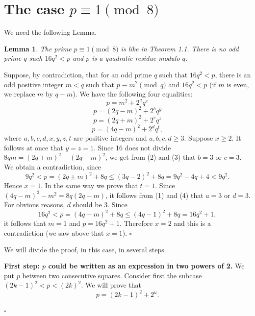 \documentclass[12pt]{article}
\newtheorem{lemma}[definition]{Lemma}
\newenvironment{proof}{{\it Proof.}}{\hfill $ \square $ \vskip 4mm}
\begin{document}
{\section{The case $p\equiv  1\pmod 8$}
We need the following Lemma.
\begin{lemma}
The prime $p\equiv 1 \pmod 8$ is like in Theorem 1.1. There is no odd prime $q$ such $16q^2<p$ and $p$ is a quadratic residue modulo $q$.
\end{lemma}
\begin{proof}
Suppose, by contradiction, that for an odd prime $q$ such that $16q^2<p$, there is an odd positive integer $m<q$ such that $p\equiv m^2\pmod q$ and $16q^2<p$ (if $m$ is even, we replace $m$ by $q-m$). We have  the following four equalities:
\begin{equation}
p=m^2+2^aq^x
\end{equation}
\begin{equation}
p=(2q-m)^2+2^bq^y
\end{equation}
\begin{equation}
p=(2q+m)^2+2^cq^z
\end{equation}
\begin{equation}
p=(4q-m)^2+2^dq^t,
\end{equation}
where $a,b,c,d,x,y,z,t$ are positive integers and $a,b,c,d\geq 3$.
 Suppose $x\geq 2$. It follows at once that $y=z=1$. Since 16  does not divide $8qm=(2q+m)^2-(2q-m)^2$, we get from (2) and (3) that $b=3$ or $c=3$. We obtain a contradiction, since
$$9q^2<p=(2q\pm m)^2+8q\leq (3q-2)^2+8q=9q^2-4q+4<9q^2.$$ Hence $x=1$. In the same way we prove  that $t=1$. Since $(4q-m)^2-m^2=8q(2q-m)$, it follows from (1) and (4) that $a=3$ or $d=3$. For obvious reasons, $d$ should be 3. Since 
$$16q^2<p=(4q-m)^2+8q\leq (4q-1)^2+8q=16q^2+1,$$ it follows that $m=1$ and $p=16q^2+1$. Therefore $x=2$ and this is a contradiction (we saw above that $x=1$).
\end{proof}

We will divide the proof, in this case, in several steps.

\begin{proof} {\bf First step: $p$ could be written as an expression in two powers of 2.}
We put $p$ between two consecutive squares. Consider first the subcase $(2k-1)^2<p<(2k)^2$. We will prove that \begin{equation}p=(2k-1)^2+2^u.
\end{equation}


\end{proof}}
\end{document}
